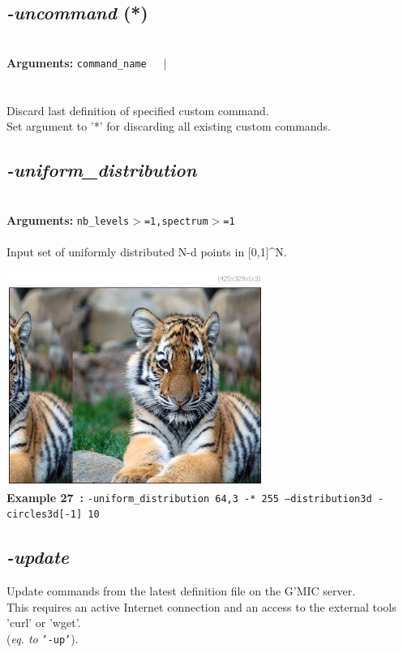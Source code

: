 \documentclass[a4paper,11pt,twoside]{book}
\begin{document}
\subsection{\emph{-uncommand} (*)}\vspace*{-0.5em}
~\\\textbf{Arguments: } 
{\small \texttt{command\_name}}~~~$|$\\
\hspace*{2.2cm}{\small \texttt{*}}\\~\\
Discard last definition of specified custom command.
~\\Set argument to '*' for discarding all existing custom commands.


\subsection{\emph{-uniform\_distribution} }\vspace*{-0.5em}
~\\\textbf{Arguments: } 
{\small \texttt{nb\_levels$>$=1,spectrum$>$=1}}\\~\\
Input set of uniformly distributed N-d points in [0,1]\textasciicircum N.
\begin{center}\includegraphics[keepaspectratio=true,height=7cm,width=\textwidth]{img/gmic_def27.jpg}\\
{\footnotesize \textbf{Example 27~:} \texttt{-uniform\_distribution 64,3 -* 255 --distribution3d -circles3d[-1] 10}}
\end{center}

\subsection{\emph{-update} }\vspace*{-0.5em}
Update commands from the latest definition file on the G'MIC server.
~\\This requires an active Internet connection and an access to the external
tools 'curl' or 'wget'.
~\\(\emph{eq. to} {\small \texttt{'-up'}}).
\end{document}
